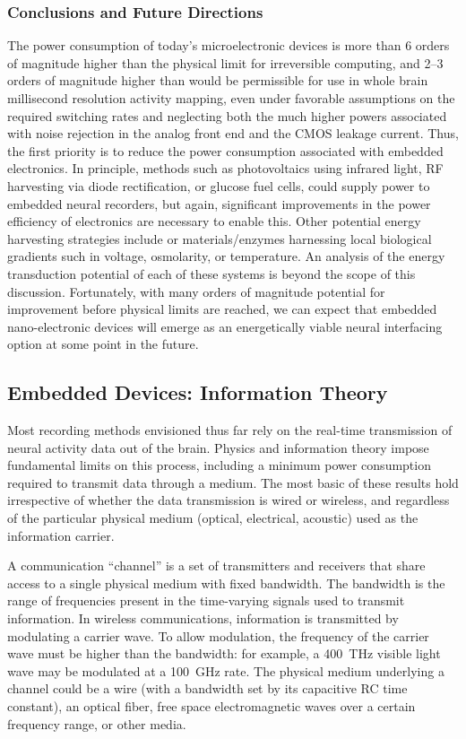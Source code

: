 \subsubsection{Conclusions and Future Directions}
The power consumption of today's microelectronic devices is more than 6 orders of magnitude higher than the physical limit for irreversible computing, and 2--3 orders of magnitude higher than would be permissible for use in whole brain millisecond resolution activity mapping, even under favorable assumptions on the required switching rates and neglecting both the much higher powers associated with noise rejection in the analog front end and the CMOS leakage current.
Thus, the first priority is to reduce the power consumption associated with embedded electronics.
In principle, methods such as photovoltaics using infrared light, RF harvesting via diode rectification, or glucose fuel cells, could supply power to embedded neural recorders, but again, significant improvements in the power efficiency of electronics are necessary to enable this.
Other potential energy harvesting strategies include or materials/enzymes harnessing local biological gradients such in voltage, osmolarity, or temperature.
An analysis of the energy transduction potential of each of these systems is beyond the scope of this discussion.
Fortunately, with many orders of magnitude potential for improvement before physical limits are reached, we can expect that embedded nano-electronic devices will emerge as an energetically viable neural interfacing option at some point in the future.

\subsection{Embedded Devices: Information Theory}

Most recording methods envisioned thus far rely on the real-time transmission of neural activity data out of the brain.
Physics and information theory impose fundamental limits on this process, including a minimum power consumption required to transmit data through a medium.
The most basic of these results hold irrespective of whether the data transmission is wired or wireless, and regardless of the particular physical medium (optical, electrical, acoustic) used as the information carrier.

A communication ``channel'' is a set of transmitters and receivers that share access to a single physical medium with fixed bandwidth.
The bandwidth is the range of frequencies present in the time-varying signals used to transmit information.
In wireless communications, information is transmitted by modulating a carrier wave.
To allow modulation, the frequency of the carrier wave must be higher than the bandwidth: for example, a \SI{400}{\tera\hertz} visible light wave may be modulated at a \SI{100}{\giga\hertz} rate.
The physical medium underlying a channel could be a wire (with a bandwidth set by its capacitive RC time constant), an optical fiber, free space electromagnetic waves over a certain frequency range, or other media.

